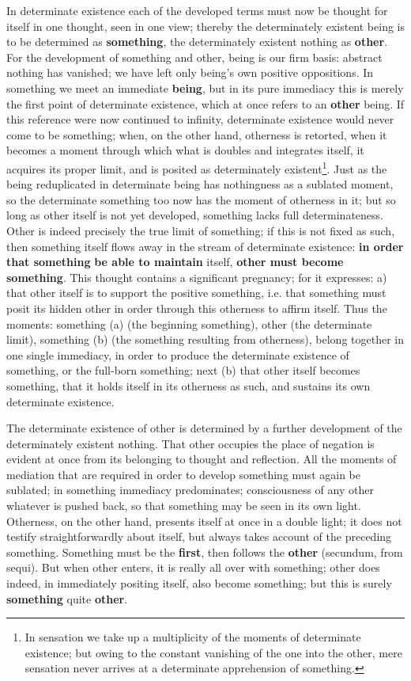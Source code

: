 \documentclass[12pt,a4paper,openany]{book}
\newcommand{\opage}[1]{\marginnote{\footnotesize\textit{[#1]}}}
\begin{document}
In determinate existence each of the developed terms must now
be thought for itself in one thought, seen in one view; thereby
the determinately existent being is to be determined as \textbf{something},
the determinately existent nothing as \textbf{other}. For the development
of something and other, being is our firm basis: abstract nothing has vanished; we have left only being's own
positive oppositions. In something we meet an
immediate \textbf{being}, but in its pure immediacy this is merely the first point of determinate existence, which at once
refers to an \textbf{other} being. If this reference
were now continued to infinity, determinate existence would
never come to be something; when, on the other hand, otherness is retorted,
when it becomes a moment through which
what is doubles and integrates itself, it acquires
its proper limit, and is posited as determinately existent\footnote{In sensation we take up a multiplicity of the moments of determinate existence; but owing to the constant vanishing of the one into the other, mere sensation never arrives at a determinate apprehension of something.}.
Just as the being reduplicated in determinate being
has nothingness as a sublated moment, so
the determinate something too now has the moment of otherness
in it; but so long as other itself is not yet developed, something lacks full determinateness. Other is
indeed precisely the true limit of something; if this is not fixed
as such, then something itself flows away in the stream of determinate existence: \textbf{in order that something} \textbf{be able to maintain} itself,
\textbf{other must become} \textbf{something}.
\setcounter{footnote}{0}%
\opage{11}This thought contains a significant pregnancy; for it expresses: a) that other itself is to support
the positive something, i.e. that something must posit its
hidden other in order through this otherness to affirm
itself. Thus the moments: something (a) (the beginning
something), other (the determinate limit), something
(b) (the something resulting from otherness), belong together
in one single immediacy, in order to produce the determinate existence
of something, or the full-born something; next (b) that
other itself becomes something, that it holds itself in its otherness
as such, and sustains its own determinate existence.

The determinate existence of other is determined by a further development
of the determinately existent nothing. That other occupies
the place of negation is evident at once from its belonging to
thought and reflection. All the moments of mediation
that are required in order to develop something must again
be sublated; in something immediacy predominates; consciousness
of any other whatever is pushed back,
so that something may be seen in its own light. Otherness, on the other hand, presents itself at once in a double light;
it does not testify straightforwardly about itself, but always takes
account of the preceding something. Something must be
the \textbf{first}, then follows the \textbf{other} (secundum, from
sequi). But when other enters, it is really
all over with something; other does indeed, in immediately
positing itself, also become something; but this is
surely \textbf{something} quite \textbf{other}.
\end{document}
